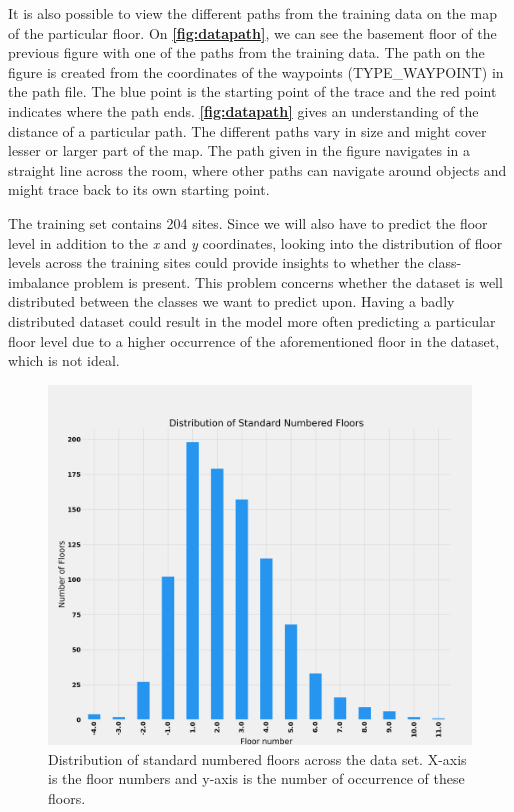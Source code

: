 It is also possible to view the different paths from the training data on the map of the particular floor. On \textbf{\autoref{fig:datapath}}, we can see the basement floor of the previous figure with one of the paths from the training data. The path on the figure is created from the coordinates of the waypoints (TYPE\_WAYPOINT) in the path file. The blue point is the starting point of the trace and the red point indicates where the path ends. \textbf{\autoref{fig:datapath}} gives an understanding of the distance of a particular path. The different paths vary in size and might cover lesser or larger part of the map. The path given in the figure navigates in a straight line across the room, where other paths can navigate around objects and might trace back to its own starting point.

The training set contains 204 sites. Since we will also have to predict the floor level in addition to the \textit{x} and \textit{y} coordinates, looking into the distribution of floor levels across the training sites could provide insights to whether the class-imbalance problem is present. This problem concerns whether the dataset is well distributed between the classes we want to predict upon. Having a badly distributed dataset could result in the model more often predicting a particular floor level due to a higher occurrence of the aforementioned floor in the dataset, which is not ideal.\cite{Han_Kamber_2012}

\begin{figure}[H]
    \centering
    \includegraphics[scale=.15]{Images/ProblemAnalysis/datadistribution1.png}
    \caption{Distribution of standard numbered floors across the data set. X-axis is the floor numbers and y-axis is the number of occurrence of these floors.}
    \label{fig:datadistribution}
\end{figure}

